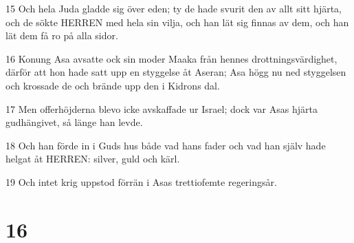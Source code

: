 \par 15 Och hela Juda gladde sig över eden; ty de hade svurit den av allt sitt hjärta, och de sökte HERREN med hela sin vilja, och han lät sig finnas av dem, och han lät dem få ro på alla sidor.
\par 16 Konung Asa avsatte ock sin moder Maaka från hennes drottningsvärdighet, därför att hon hade satt upp en styggelse åt Aseran; Asa högg nu ned styggelsen och krossade de och brände upp den i Kidrons dal.
\par 17 Men offerhöjderna blevo icke avskaffade ur Israel; dock var Asas hjärta gudhängivet, så länge han levde.
\par 18 Och han förde in i Guds hus både vad hans fader och vad han själv hade helgat åt HERREN: silver, guld och kärl.
\par 19 Och intet krig uppstod förrän i Asas trettiofemte regeringsår.

\chapter{16}


